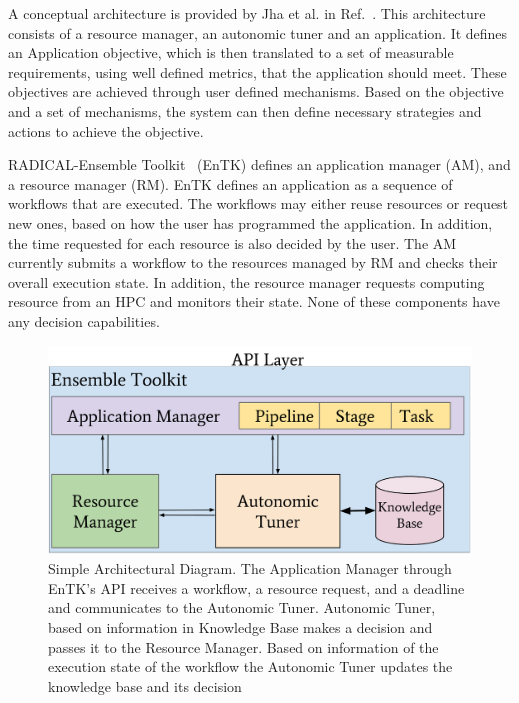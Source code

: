 A conceptual architecture is provided by Jha et al. in Ref.~\cite{jha2009self}. 
This architecture consists of a resource manager, an autonomic tuner and an application. 
It defines an Application objective, which is then translated to a set of measurable 
requirements, using well defined metrics, that the application should meet. These 
objectives are achieved through user defined mechanisms. Based on the objective and 
a set of mechanisms, the system can then define necessary strategies and actions to 
achieve the objective.

RADICAL-Ensemble Toolkit~\cite{balasubramanian2018harnessing} (EnTK) defines 
an application manager (AM), and a resource manager (RM). EnTK defines an 
application as a sequence of workflows that are executed. The workflows may 
either reuse resources or request new ones, based on how the user has programmed 
the application. In addition, the time requested for each resource is also 
decided by the user. The AM currently submits a workflow to the resources 
managed by RM and checks their overall execution state. In addition, the resource 
manager requests computing resource from an HPC and monitors their state. None 
of these components have any decision capabilities.

\begin{figure}[t]
    \centering
    \includegraphics[width=.95\textwidth]{./AutonomicSubsystem.pdf}
    \caption{Simple Architectural Diagram. The Application Manager through 
        EnTK's API receives a workflow, a resource request, and a deadline and 
        communicates to the Autonomic Tuner. Autonomic Tuner, based on information 
        in Knowledge Base makes a decision and passes it to the Resource Manager.
        Based on information of the execution state of the workflow the Autonomic
        Tuner updates the knowledge base and its decision}\label{fig:architecture}
\end{figure}


